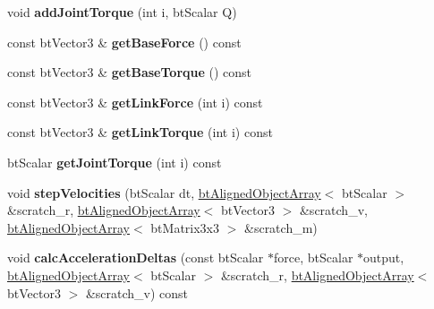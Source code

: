 \begin{DoxyCompactItemize}
\item 
\hypertarget{classbt_multi_body_a7c55a0935f2bcc58863c9d6724f3976a}{void {\bfseries add\+Joint\+Torque} (int i, bt\+Scalar Q)}\label{classbt_multi_body_a7c55a0935f2bcc58863c9d6724f3976a}

\item 
\hypertarget{classbt_multi_body_a79dc0e7a8a409f47909250b9ffa2e1e6}{const bt\+Vector3 \& {\bfseries get\+Base\+Force} () const }\label{classbt_multi_body_a79dc0e7a8a409f47909250b9ffa2e1e6}

\item 
\hypertarget{classbt_multi_body_a6b679575df8c6ff92867ec0f7ed35a6a}{const bt\+Vector3 \& {\bfseries get\+Base\+Torque} () const }\label{classbt_multi_body_a6b679575df8c6ff92867ec0f7ed35a6a}

\item 
\hypertarget{classbt_multi_body_a60df7f714c58622f9beeadc85afa81a5}{const bt\+Vector3 \& {\bfseries get\+Link\+Force} (int i) const }\label{classbt_multi_body_a60df7f714c58622f9beeadc85afa81a5}

\item 
\hypertarget{classbt_multi_body_a0af6ab925c2e0309b23c57a972a18328}{const bt\+Vector3 \& {\bfseries get\+Link\+Torque} (int i) const }\label{classbt_multi_body_a0af6ab925c2e0309b23c57a972a18328}

\item 
\hypertarget{classbt_multi_body_a2f7049848432520db198c92915e5ce1a}{bt\+Scalar {\bfseries get\+Joint\+Torque} (int i) const }\label{classbt_multi_body_a2f7049848432520db198c92915e5ce1a}

\item 
\hypertarget{classbt_multi_body_a19f334bbde8909b282cd55bc28d75b4b}{void {\bfseries step\+Velocities} (bt\+Scalar dt, \hyperlink{classbt_aligned_object_array}{bt\+Aligned\+Object\+Array}$<$ bt\+Scalar $>$ \&scratch\+\_\+r, \hyperlink{classbt_aligned_object_array}{bt\+Aligned\+Object\+Array}$<$ bt\+Vector3 $>$ \&scratch\+\_\+v, \hyperlink{classbt_aligned_object_array}{bt\+Aligned\+Object\+Array}$<$ bt\+Matrix3x3 $>$ \&scratch\+\_\+m)}\label{classbt_multi_body_a19f334bbde8909b282cd55bc28d75b4b}

\item 
\hypertarget{classbt_multi_body_af64bc1fed1e0d4d55340c939ef0a24fd}{void {\bfseries calc\+Acceleration\+Deltas} (const bt\+Scalar $\ast$force, bt\+Scalar $\ast$output, \hyperlink{classbt_aligned_object_array}{bt\+Aligned\+Object\+Array}$<$ bt\+Scalar $>$ \&scratch\+\_\+r, \hyperlink{classbt_aligned_object_array}{bt\+Aligned\+Object\+Array}$<$ bt\+Vector3 $>$ \&scratch\+\_\+v) const }\label{classbt_multi_body_af64bc1fed1e0d4d55340c939ef0a24fd}


\end{DoxyCompactItemize}
